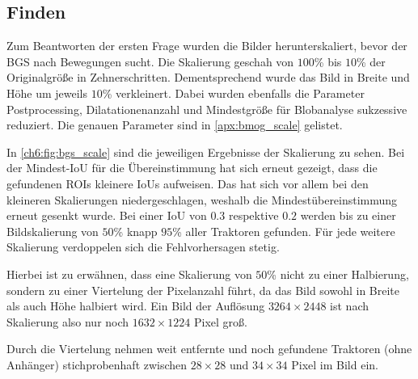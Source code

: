 \subsection*{Finden}
Zum Beantworten der ersten Frage wurden die Bilder herunterskaliert, bevor der \ac{BGS} nach Bewegungen sucht.
Die Skalierung geschah von $100$\% bis $10$\% der Originalgröße in Zehnerschritten.
Dementsprechend wurde das Bild in Breite und Höhe um jeweils $10$\% verkleinert.
Dabei wurden ebenfalls die Parameter Postprocessing, Dilatationenanzahl und Mindestgröße für Blobanalyse sukzessive reduziert.
Die genauen Parameter sind in \autoref{apx:bmog_scale} gelistet.

In \autoref{ch6:fig:bgs_scale} sind die jeweiligen Ergebnisse der Skalierung zu sehen.
Bei der Mindest-\ac{IoU} für die Übereinstimmung hat sich erneut gezeigt, dass die gefundenen \acp{ROI} kleinere \acp{IoU} aufweisen.
Das hat sich vor allem bei den kleineren Skalierungen niedergeschlagen, weshalb die Mindestübereinstimmung erneut gesenkt wurde.
Bei einer \ac{IoU} von $0.3$ respektive $0.2$ werden bis zu einer Bildskalierung von $50$\% knapp $95$\% aller Traktoren gefunden.
Für jede weitere Skalierung verdoppelen sich die Fehlvorhersagen stetig.

Hierbei ist zu erwähnen, dass eine Skalierung von $50$\% nicht zu einer Halbierung, sondern zu einer Viertelung der Pixelanzahl führt, da das Bild sowohl in Breite als auch Höhe halbiert wird.
Ein Bild der Auflösung $3264 \times 2448$ ist nach Skalierung also nur noch $1632 \times 1224$ Pixel groß.

Durch die Viertelung nehmen weit entfernte und noch gefundene Traktoren (ohne Anhänger) stichprobenhaft zwischen $28 \times 28$ und $34 \times 34$ Pixel im Bild ein.

